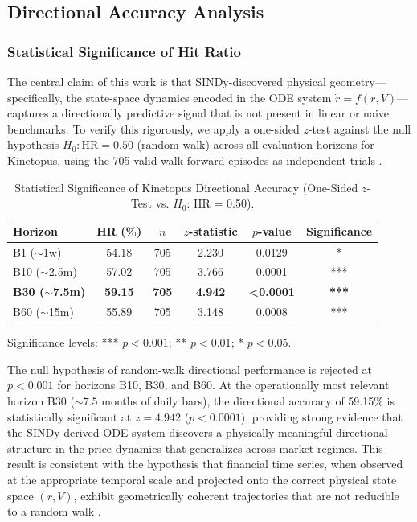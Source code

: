 \documentclass[11pt,a4paper]{article}
\begin{document}
\subsection{Directional Accuracy Analysis}
\label{sec:significance_analysis}

\subsubsection{Statistical Significance of Hit Ratio}
The central claim of this work is that SINDy-discovered physical geometry---specifically, the state-space dynamics encoded in the ODE system $\dot{r} = f(r, V)$---captures a directionally predictive signal that is not present in linear or naive benchmarks. To verify this rigorously, we apply a one-sided $z$-test against the null hypothesis $H_0: \text{HR} = 0.50$ (random walk) across all evaluation horizons for Kinetopus, using the 705 valid walk-forward episodes as independent trials \cite{diebold1995comparing}.

\begin{table}[H]
\centering
\small
\caption{Statistical Significance of Kinetopus Directional Accuracy (One-Sided $z$-Test vs. $H_0$: HR = 0.50).}
\label{tab:significance_test}
\begin{tabular}{lccccc}
\toprule
\textbf{Horizon} & \textbf{HR (\%)} & \textbf{$n$} & \textbf{$z$-statistic} & \textbf{$p$-value} & \textbf{Significance} \\
\midrule
B1 ($\sim$1w) & 54.18 & 705 & 2.230 & 0.0129 & * \\
B10 ($\sim$2.5m) & 57.02 & 705 & 3.766 & 0.0001 & *** \\
\textbf{B30 ($\sim$7.5m)} & \textbf{59.15} & \textbf{705} & \textbf{4.942} & \textbf{<0.0001} & \textbf{***} \\
B60 ($\sim$15m) & 55.89 & 705 & 3.148 & 0.0008 & *** \\
\bottomrule
\end{tabular}
\end{table}
\noindent *Significance levels: *** $p < 0.001$; ** $p < 0.01$; * $p < 0.05$.

The null hypothesis of random-walk directional performance is rejected at $p < 0.001$ for horizons B10, B30, and B60. At the operationally most relevant horizon B30 ($\sim 7.5$ months of daily bars), the directional accuracy of 59.15\% is statistically significant at $z = 4.942$ ($p < 0.0001$), providing strong evidence that the SINDy-derived ODE system discovers a physically meaningful directional structure in the price dynamics that generalizes across market regimes. This result is consistent with the hypothesis that financial time series, when observed at the appropriate temporal scale and projected onto the correct physical state space $(r, V)$, exhibit geometrically coherent trajectories that are not reducible to a random walk \cite{brunton2016discovering}.
\end{document}
